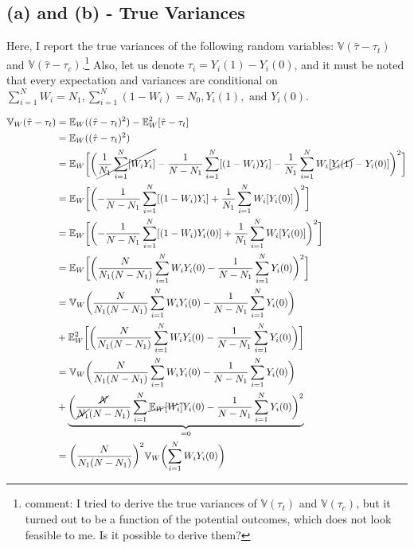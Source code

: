 \documentclass[11pt]{article}
\numberwithin{equation}{section}
\newcommand{\E}{\mathbb{E}}
\newcommand{\Var}{\mathbb{V}}
\begin{document}
\subsection*{(a) and (b) - True Variances}

Here, I report the true variances of the following random variables: $\Var(\hat\tau - \tau_t)$ and $\Var(\hat\tau - \tau_c)$.\footnote{\color{blue}comment: I tried to derive the true variances of $\Var(\tau_t)$ and $\Var(\tau_c)$, but it turned out to be a function of the potential outcomes, which does not look feasible to me. Is it possible to derive them?}
Also, let us denote $\tau_i = Y_i(1) - Y_i(0)$, and it must be noted that every expectation and variances are conditional on 
$\sum_{i=1}^N W_i = N_1, \sum_{i=1}^N (1-W_i) = N_0, Y_i(1), \text{ and } Y_i(0)$.

\begin{align*}
    \Var_W(\hat\tau - \tau_t) &= \E_W((\hat\tau - \tau_t)^2) - \E_W^2[\hat\tau - \tau_t]\\
    &= \E_W((\hat\tau - \tau_t)^2) \\
    &=\mathbb{E}_W\biggl[ \biggl(\cancel{\frac{1}{N_1}\sum_{i=1}^N[W_iY_i]}-\frac{1}{N-N_1}\sum_{i=1}^N[(1-W_i)Y_i]- \frac{1}{N_1} \sum_{i=1}^N W_i[\cancel{Y_i(1)} - Y_i(0)]\biggr)^2\biggr]\\
     &= \mathbb{E}_W\biggl[ \biggl(-\frac{1}{N-N_1}\sum_{i=1}^N[(1-W_i)Y_i]+ \frac{1}{N_1} \sum_{i=1}^N W_i[Y_i(0)]\biggr)^2\biggr]\\
    &= \mathbb{E}_W\biggl[ \biggl(-\frac{1}{N-N_1}\sum_{i=1}^N[(1-W_i)Y_i(0)]+ \frac{1}{N_1} \sum_{i=1}^N W_i[Y_i(0)]\biggr)^2\biggr]\\
    &=\mathbb{E}_W\biggl[\biggl( \frac{N}{N_1(N-N_1)}\sum_{i=1}^NW_iY_i(0) - \frac{1}{N-N_1}\sum_{i=1}^N Y_i(0)\biggr)^2\biggr]\\
    &= \mathbb{V}_W\biggl( \frac{N}{N_1(N-N_1)}\sum_{i=1}^NW_iY_i(0) - \frac{1}{N-N_1}\sum_{i=1}^N Y_i(0)\biggr) \notag \\
    &+  \mathbb{E}_W^2 \biggl[\biggl( \frac{N}{N_1(N-N_1)}\sum_{i=1}^NW_iY_i(0) - \frac{1}{N-N_1}\sum_{i=1}^N Y_i(0)\biggr)\biggr]\\
    &= \mathbb{V}_W\biggl( \frac{N}{N_1(N-N_1)}\sum_{i=1}^NW_iY_i(0) - \frac{1}{N-N_1}\sum_{i=1}^N Y_i(0)\biggr) \notag \\
    &+ \underbrace{ \biggl( \frac{\cancel{N}}{\cancel{N_1}(N-N_1)}\sum_{i=1}^N\cancel{\mathbb{E}_W[W_i]}Y_i(0) - \frac{1}{N-N_1}\sum_{i=1}^N Y_i(0)\biggr)^2}_{=0}\\
    &= \biggl(\frac{N}{N_1(N-N_1)}\biggr)^2\mathbb{V}_W\biggl( \sum_{i=1}^NW_iY_i(0)\biggr)\\

\end{align*}
\end{document}
